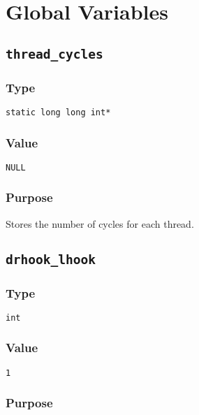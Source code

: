 \section{Global Variables}

\subsection{\texttt{thread\_cycles}}
\vspace{-2ex}
\subsubsection{Type}
\vspace{-2ex}
\verb|static long long int*|

\vspace{-2ex}
\subsubsection{Value}
\vspace{-2ex}
\verb|NULL|

\vspace{-2ex}
\subsubsection{Purpose}
\vspace{-2ex}
Stores the number of cycles for each thread.


\subsection{\texttt{drhook\_lhook}}
\vspace{-2ex}
\subsubsection{Type}
\vspace{-2ex}
\verb|int|

\vspace{-2ex}
\subsubsection{Value}
\vspace{-2ex}
\verb|1|

\vspace{-2ex}
\subsubsection{Purpose}
\vspace{-2ex}

